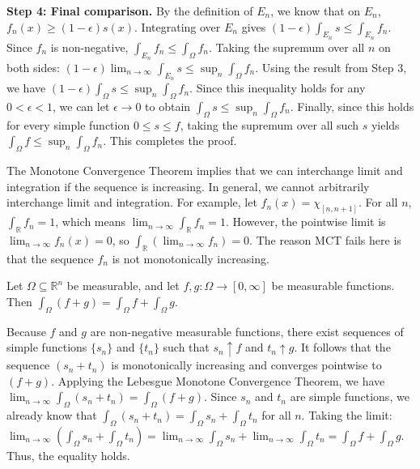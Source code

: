 \begin{pfbox}
    \textbf{Step 4: Final comparison.} 
    By the definition of $E_n$, we know that on $E_n$, $f_n(x) \ge (1-\epsilon)s(x)$. Integrating over $E_n$ gives $(1-\epsilon) \int_{E_n} s \le \int_{E_n} f_n$. Since $f_n$ is non-negative, $\int_{E_n} f_n \le \int_\Omega f_n$.
    Taking the supremum over all $n$ on both sides:
    $(1-\epsilon) \displaystyle\lim_{n\to\infty} \int_{E_n} s \le \sup_n \int_\Omega f_n$.
    Using the result from Step 3, we have $(1-\epsilon) \int_\Omega s \le \sup_n \int_\Omega f_n$.
    Since this inequality holds for any $0 < \epsilon < 1$, we can let $\epsilon \to 0$ to obtain $\int_\Omega s \le \sup_n \int_\Omega f_n$.
    Finally, since this holds for every simple function $0 \le s \le f$, taking the supremum over all such $s$ yields $\int_\Omega f \le \sup_n \int_\Omega f_n$. This completes the proof.
\end{pfbox}

\begin{remark}
    The Monotone Convergence Theorem implies that we can interchange limit and integration if the sequence is increasing. In general, we cannot arbitrarily interchange limit and integration.
    For example, let $f_n(x) = \chi_{[n, n+1]}$. For all $n$, $\int_\mathbb{R} f_n = 1$, which means $\lim_{n\to\infty} \int_\mathbb{R} f_n = 1$. However, the pointwise limit is $\lim_{n\to\infty} f_n(x) = 0$, so $\int_\mathbb{R} (\lim_{n\to\infty} f_n) = 0$. The reason MCT fails here is that the sequence $f_n$ is not monotonically increasing.
\end{remark}

\begin{theorem}
    Let $\Omega \subseteq \mathbb{R}^n$ be measurable, and let $f,g : \Omega \rightarrow [0, \infty]$ be measurable functions. Then $\int_\Omega (f+g) = \int_\Omega f + \int_\Omega g$.
\end{theorem}
\begin{pfbox}
    Because $f$ and $g$ are non-negative measurable functions, there exist sequences of simple functions $\{s_n\}$ and $\{t_n\}$ such that $s_n \uparrow f$ and $t_n \uparrow g$.
    It follows that the sequence $(s_n + t_n)$ is monotonically increasing and converges pointwise to $(f+g)$.
    Applying the Lebesgue Monotone Convergence Theorem, we have $\displaystyle\lim_{n\to\infty} \int_\Omega (s_n + t_n) = \int_\Omega (f+g)$.
    Since $s_n$ and $t_n$ are simple functions, we already know that $\int_\Omega (s_n + t_n) = \int_\Omega s_n + \int_\Omega t_n$ for all $n$.
    Taking the limit: $\displaystyle\lim_{n\to\infty} \left(\int_\Omega s_n + \int_\Omega t_n\right) = \displaystyle\lim_{n\to\infty} \int_\Omega s_n + \displaystyle\lim_{n\to\infty} \int_\Omega t_n = \int_\Omega f + \int_\Omega g$. Thus, the equality holds.
\end{pfbox}

